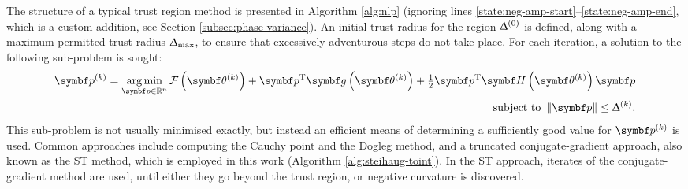 The structure of a typical trust region method is presented in Algorithm
\ref{alg:nlp} (ignoring lines
\ref{state:neg-amp-start}--\ref{state:neg-amp-end}, which is a custom addition,
see Section \ref{subsec:phase-variance}). An initial trust radius for the region
$\Updelta^{(0)}$ is defined, along with a maximum permitted trust radius
$\Updelta_{\text{max}}$, to ensure that excessively adventurous steps do not take place.
For each iteration, a solution to the following sub-problem is sought:
\begin{equation}
    \begin{split}
        \bpk = \argmin_{\bp \in \mathbb{R}^{n}}
            \Fthk +
            \bp\T \bdgthk +
            \tfrac{1}{2} \bp\T \bdHthk \bp \\
        \text{subject to } \left \lVert \bp \right \rVert \leq \trustradius{k}.
    \end{split}
\end{equation}
This sub-problem is not usually minimised exactly, but instead an efficient
means of determining a sufficiently good value for $\bpk$ is used.
Common approaches include computing the Cauchy point and the Dogleg
method, and a truncated conjugate-gradient
approach, also known as the \ac{ST} method\cite[Chapter 7]{Nocedal2006},
which is employed in this work (Algorithm \ref{alg:steihaug-toint}). In the
\ac{ST} approach, iterates of the conjugate-gradient method are used, until
either they go beyond the trust region, or negative curvature is discovered.

